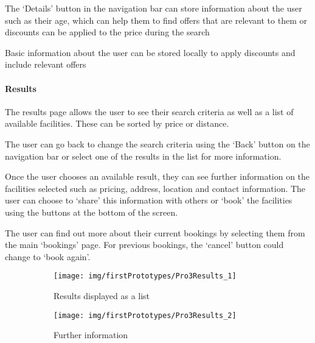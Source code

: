 The `Details' button in the navigation bar can store information about the user
such as their age, which can help them to find offers that are relevant to them
or discounts can be applied to the price during the search

Basic information about the user can be stored locally to apply discounts and
include relevant offers

\paragraph{Results}

The results page allows the user to see their search criteria as well as a list
of available facilities. These can be sorted by price or distance.

The user can go back to change the search criteria using the `Back' button on
the navigation bar or select one of the results in the list for more
information.

Once the user chooses an available result, they can see further information on
the facilities selected such as pricing, address, location and contact
information. The user can choose to `share' this information with others or
`book' the facilities using the buttons at the bottom of the screen.

The user can find out more about their current bookings by selecting them from
the main `bookings' page. For previous bookings, the `cancel' button could
change to `book again'.

\begin{figure}[htbp]
    \centering
    \begin{subfigure}[b]{0.45\textwidth}
        \texttt{[image: img/firstPrototypes/Pro3Results\_1]}
        \caption{Results displayed as a list}\label{fig:Pro3Results_1}
    \end{subfigure}%
    \qquad
    \begin{subfigure}[b]{0.45\textwidth}
        \texttt{[image: img/firstPrototypes/Pro3Results\_2]}
        \caption{Further information}\label{fig:Pro3Results_2}
    \end{subfigure}
    \caption{}\label{fig:Pro3Results}
\end{figure}

